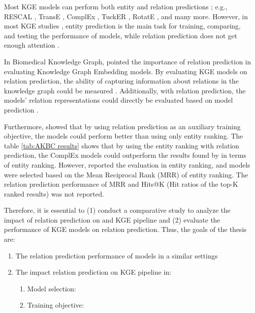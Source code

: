 Most KGE models can perform both entity and relation predictions \citep{wang2017knowledge}; e.g., RESCAL \citep{nickel2011three}, TransE \citep{bordes2013translating}, ComplEx \citep{trouillon2016complex}, TuckER \citep{balazevic-etal-2019-tucker}, RotatE \citep{sun2019rotate}, and many more. However, in most KGE studies \citep{yang2014embedding, wang2014knowledge, trouillon2016complex, shang2018endtoend, sun2019rotate}, entity prediction is the main task for training, comparing, and testing the performance of models, while relation prediction does not get enough attention \citep{chang2020benchmark}. 

In Biomedical Knowledge Graph, \citet{chang2020benchmark} pointed the importance of relation prediction in evaluating Knowledge Graph Embedding models. By evaluating KGE models on relation prediction, the ability of capturing information about relations in the knowledge graph could be measured \citep{chang2020benchmark}. Additionally, with relation prediction, the models' relation representations could directly be evaluated based on model prediction \citep{chang2020benchmark}. 

Furthermore, \citet{chen2021relation} showed that by using relation prediction as an auxiliary training objective, the models could perform better than using only entity ranking. The table \ref{tab:AKBC results} shows that by using the entity ranking with relation prediction, the ComplEx models could outperform the results found by \citet{Ruffinelli2020You} in terms of entity ranking. However, \citet{chen2021relation} reported the evaluation in entity ranking, and models were selected based on the Mean Reciprocal Rank (MRR) of entity ranking. The relation prediction performance of MRR and Hits@K (Hit ratios of the top-K ranked results) was not reported. 

Therefore, it is essential to (1) conduct a comparative study to analyze the impact of relation prediction on and KGE pipeline and (2) evaluate the performance of KGE models on relation prediction. Thus, the goals of the thesis are:
\begin{enumerate}
    \item The relation prediction performance of models in a similar settings
    \item The impact relation prediction on KGE pipeline in:
    \begin{enumerate}
        \item Model selection: 
        \item Training objective:
    \end{enumerate}
\end{enumerate}


